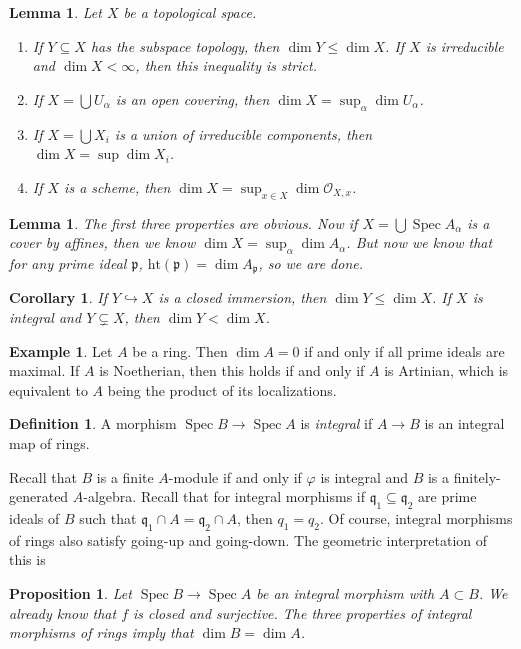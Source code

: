 \documentclass[leqno, openany]{memoir}
\newtheorem{cor}[thm]{Corollary}
\newtheorem{prop}[thm]{Proposition}
\newtheorem{lem}[thm]{Lemma}
\theoremstyle{definition}
\newtheorem{defn}[thm]{Definition}
\newtheorem{exm}[thm]{Example}
\theoremstyle{remark}
\theoremstyle{plain}
\theoremstyle{definition}
\theoremstyle{remark}
\newcommand{\mc}[1]{\mathcal{#1}}
\newcommand{\mf}[1]{\mathfrak{#1}}
\newcommand{\mr}[1]{\mathrm{#1}}
\DeclareMathOperator{\Spec}{Spec}
\begin{document}
\begin{lem} Let $X$ be a topological space.  \begin{enumerate} \item If $Y
    \subseteq X$ has the subspace topology, then $\dim Y \leq \dim X$. If $X$
    is irreducible and $\dim X < \infty$, then this inequality is strict.
\item If $X = \bigcup U_{\alpha}$ is an open covering, then $\dim X =
    \sup_{\alpha} \dim U_{\alpha}$.  \item If $X = \bigcup X_i$ is a union of
    irreducible components, then $\dim X = \sup \dim X_i$.  \item If $X$ is a
    scheme, then $\dim X = \sup_{x \in X} \dim \mc{O}_{X,x}$.  \end{enumerate}
\end{lem}

\begin{lem} The first three properties are obvious. Now if $X = \bigcup \Spec
    A_{\alpha}$ is a cover by affines, then we know $\dim X = \sup_{\alpha}
    \dim A_{\alpha}$. But now we know that for any prime ideal $\mf{p}$,
    $\mr{ht}(\mf{p}) = \dim A_{\mf{p}}$, so we are done.  \end{lem}

\begin{cor} If $Y \hookrightarrow X$ is a closed immersion, then $\dim Y \leq
\dim X$. If $X$ is integral and $Y \subsetneq X$, then $\dim Y < \dim X$.
\end{cor}

\begin{exm} Let $A$ be a ring. Then $\dim A = 0$ if and only if all prime
ideals are maximal. If $A$ is Noetherian, then this holds if and only if $A$ is
Artinian, which is equivalent to $A$ being the product of its localizations.
\end{exm}

\begin{defn} A morphism $\Spec B \to \Spec A$ is \textit{integral} if $A \to B$
is an integral map of rings.  \end{defn}

Recall that $B$ is a finite $A$-module if and only if $\varphi$ is integral and
$B$ is a finitely-generated $A$-algebra. Recall that for integral morphisms if
$\mf{q}_1 \subseteq \mf{q}_2$ are prime ideals of $B$ such that $\mf{q}_1 \cap
A = \mf{q}_2 \cap A$, then $q_1 = q_2$. Of course, integral morphisms of rings
also satisfy going-up and going-down. The geometric interpretation of this is
\begin{prop} Let $\Spec B \to \Spec A$ be an integral morphism with $A \subset
B$. We already know that $f$ is closed and surjective. The three properties of
integral morphisms of rings imply that $\dim B = \dim A$.  \end{prop}
\end{document}
